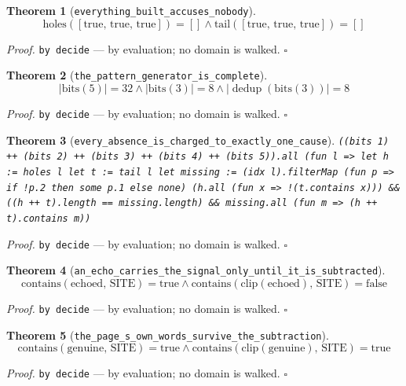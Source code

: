 \documentclass[11pt]{article}
\newtheorem{theorem}{Theorem}[section]
\begin{document}
\begin{theorem}[\texttt{everything\_built\_accuses\_nobody}]
\[ \mathrm{holes}\mathopen{}\left([\mathrm{true},\,\mathrm{true},\,\mathrm{true}]\right) = [] \land \mathrm{tail}\mathopen{}\left([\mathrm{true},\,\mathrm{true},\,\mathrm{true}]\right) = [] \]
\end{theorem}
\noindent\emph{Proof.} \texttt{by decide} --- by evaluation; no domain is walked. \hfill$\square$

\begin{theorem}[\texttt{the\_pattern\_generator\_is\_complete}]
\[ \left|\mathrm{bits}\mathopen{}\left(5\right)\right| = 32 \land \left|\mathrm{bits}\mathopen{}\left(3\right)\right| = 8 \land \left|\operatorname{dedup}\left(\mathrm{bits}\mathopen{}\left(3\right)\right)\right| = 8 \]
\end{theorem}
\noindent\emph{Proof.} \texttt{by decide} --- by evaluation; no domain is walked. \hfill$\square$

\begin{theorem}[\texttt{every\_absence\_is\_charged\_to\_exactly\_one\_cause}]
\texttt{((bits 1) ++ (bits 2) ++ (bits 3) ++ (bits 4) ++ (bits 5)).all (fun l => let h := holes l let t := tail l let missing := (idx l).filterMap (fun p => if !p.2 then some p.1 else none) (h.all (fun x => !(t.contains x))) \&\& ((h ++ t).length == missing.length) \&\& missing.all (fun m => (h ++ t).contains m))}
\end{theorem}
\noindent\emph{Proof.} \texttt{by decide} --- by evaluation; no domain is walked. \hfill$\square$

\begin{theorem}[\texttt{an\_echo\_carries\_the\_signal\_only\_until\_it\_is\_subtracted}]
\[ \mathrm{contains}\mathopen{}\left(\mathrm{echoed},\,\mathrm{SITE}\right) = \mathrm{true} \land \mathrm{contains}\mathopen{}\left(\mathrm{clip}\mathopen{}\left(\mathrm{echoed}\right),\,\mathrm{SITE}\right) = \mathrm{false} \]
\end{theorem}
\noindent\emph{Proof.} \texttt{by decide} --- by evaluation; no domain is walked. \hfill$\square$

\begin{theorem}[\texttt{the\_page\_s\_own\_words\_survive\_the\_subtraction}]
\[ \mathrm{contains}\mathopen{}\left(\mathrm{genuine},\,\mathrm{SITE}\right) = \mathrm{true} \land \mathrm{contains}\mathopen{}\left(\mathrm{clip}\mathopen{}\left(\mathrm{genuine}\right),\,\mathrm{SITE}\right) = \mathrm{true} \]
\end{theorem}
\noindent\emph{Proof.} \texttt{by decide} --- by evaluation; no domain is walked. \hfill$\square$
\end{document}
